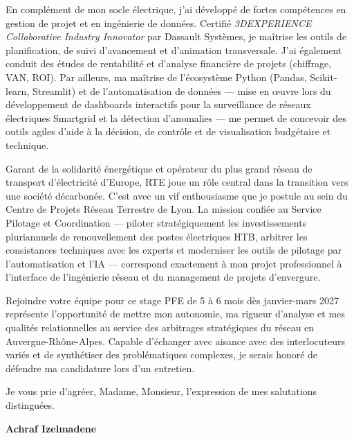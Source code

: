 \documentclass[10pt,a4paper]{altacv}
\begin{document}
\vspace{5pt}

En complément de mon socle électrique, j'ai développé de fortes compétences en gestion de projet et en ingénierie de données. Certifié \textit{3DEXPERIENCE Collaborative Industry Innovator} par Dassault Systèmes, je maîtrise les outils de planification, de suivi d'avancement et d'animation transversale. J'ai également conduit des études de rentabilité et d'analyse financière de projets (chiffrage, VAN, ROI). Par ailleurs, ma maîtrise de l'écosystème Python (Pandas, Scikit-learn, Streamlit) et de l'automatisation de données — mise en œuvre lors du développement de dashboards interactifs pour la surveillance de réseaux électriques Smartgrid et la détection d'anomalies — me permet de concevoir des outils agiles d'aide à la décision, de contrôle et de visualisation budgétaire et technique.

\vspace{5pt}

Garant de la solidarité énergétique et opérateur du plus grand réseau de transport d'électricité d'Europe, RTE joue un rôle central dans la transition vers une société décarbonée. C'est avec un vif enthousiasme que je postule au sein du Centre de Projets Réseau Terrestre de Lyon. La mission confiée au Service Pilotage et Coordination — piloter stratégiquement les investissements pluriannuels de renouvellement des postes électriques HTB, arbitrer les consistances techniques avec les experts et moderniser les outils de pilotage par l'automatisation et l'IA — correspond exactement à mon projet professionnel à l'interface de l'ingénierie réseau et du management de projets d'envergure.

\vspace{5pt}

Rejoindre votre équipe pour ce stage PFE de 5 à 6 mois dès janvier-mars 2027 représente l'opportunité de mettre mon autonomie, ma rigueur d'analyse et mes qualités relationnelles au service des arbitrages stratégiques du réseau en Auvergne-Rhône-Alpes. Capable d'échanger avec aisance avec des interlocuteurs variés et de synthétiser des problématiques complexes, je serais honoré de défendre ma candidature lors d'un entretien.

\vspace{6pt}

Je vous prie d'agréer, Madame, Monsieur, l'expression de mes salutations distinguées.

\vspace{12pt}

\begin{flushright}
  \large\color{emphasis}\textbf{Achraf Izelmadene}
\end{flushright}
\end{document}
